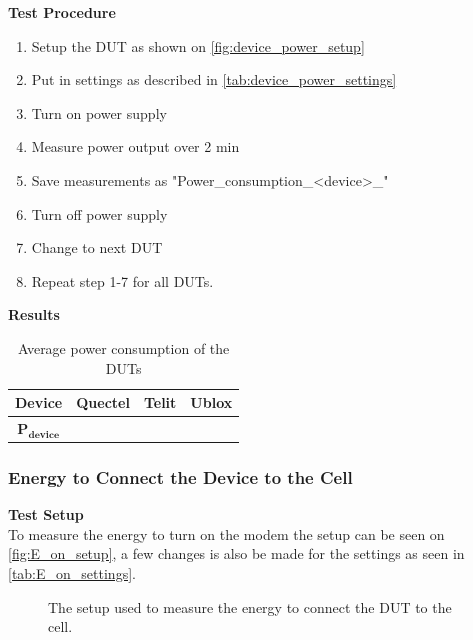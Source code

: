 \textbf{Test Procedure}\\
\begin{enumerate}
\item Setup the \gls{DUT} as shown on \autoref{fig:device_power_setup}
\item Put in settings as described in \autoref{tab:device_power_settings} 
\item Turn on power supply 
\item Measure power output over 2 min
\item Save measurements as "Power\_consumption\_<device>\_<Parameters used>"
\item Turn off power supply
\item Change to next \gls{DUT}
\item Repeat step 1-7 for all \gls{DUT}s.
\end{enumerate}

\textbf{Results}\\
\begin{table}[H]
\centering
\begin{tabular}{|c|c|c|c|}\hline
\textbf{Device}	& Quectel	& Telit & Ublox \\ \hline
$\mathbf{P_{device}}$	& & & \\ \hline
\end{tabular}
\caption{Average power consumption of the \gls{DUT}s}
\label{tab:device_power_results}
\end{table}

\subsubsection{Energy to Connect the Device to the Cell}
\textbf{Test Setup}\\
To measure the energy to turn on the modem the setup can be seen on \autoref{fig:E_on_setup}, a few changes is also be made for the settings as seen in \autoref{tab:E_on_settings}.

\begin{figure}[H]
\centering
{}
\caption{The setup used to measure the energy to connect the \gls{DUT} to the cell.}
\label{fig:E_on_setup}
\end{figure}



